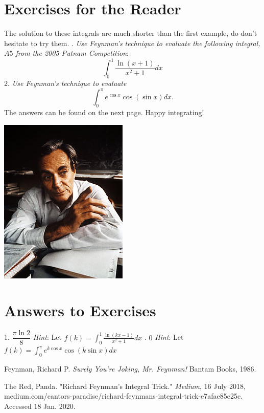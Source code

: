 \documentclass{article}
\begin{document}
\section*{Exercises for the Reader}
The solution to these integrals are much shorter than the first example, do don't hesitate to try them.
\newline {}. \textit{Use Feynman's technique to evaluate the following integral, $A5$ from the 2005 Putnam Competition}:
$$\int_{0}^{1}\frac{\ln(x+1)}{x^2+1}dx$$
2. \textit{Use Feynman's technique to evaluate}
$$\int_{0}^{\pi}e^{\cos{x}}\cos{(\sin{x})}dx.$$
The answers can be found on the next page. Happy integrating!
\newline
\begin{center}
    \includegraphics[scale=0.5]{feynman}
\end{center}

\newpage
\section*{Answers to Exercises}
1. $\boxed{\dfrac{\pi\ln{2}}{8}}$
\newline \textit{Hint}: Let $\displaystyle{f(k)=\int_{0}^{1}\frac{\ln({kx-1})}{x^2+1}}dx$
\newline {}. $\boxed{0}$
\newline \textit{Hint}: Let $\displaystyle{f(k)=\int_{0}^{\pi}e^{k\cos{x}}\cos({k\sin{x}})}dx$
\begin{thebibliography}{2}
Feynman, Richard P.
\textit{Surely You're Joking, Mr. Feynman!}
Bantam Books, 1986.

The Red, Panda. "Richard Feynman's Integral Trick." 
\textit{Medium}, 16 July 2018, medium.com/cantors-paradise/richard-feynmans-integral-trick-e7afae85e25c. Accessed 18 Jan. 2020.
\end{thebibliography}
\end{document}
